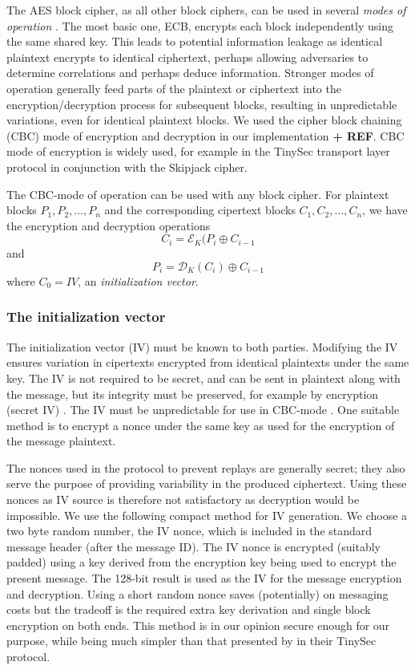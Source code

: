 The AES block cipher, as all other block ciphers, can be used in several \textit{modes of operation} . The most basic one, ECB, encrypts each block independently using the same shared key.  This leads to potential information leakage as identical plaintext encrypts to identical ciphertext, perhaps allowing adversaries to determine correlations and perhaps deduce information. Stronger modes of operation generally feed parts of the plaintext or ciphertext into the encryption/decryption process for subsequent blocks, resulting in unpredictable variations, even for identical plaintext blocks. We used the cipher block chaining (CBC) mode of encryption and decryption in our implementation \textbf{ + REF}. CBC mode of encryption is widely used, for example in the TinySec transport layer protocol  in conjunction with the Skipjack \cite{} cipher.

The CBC-mode of operation can be used with any block cipher. For plaintext blocks $P_1, P_2, \dots, P_n$ and the corresponding cipertext blocks $C_1, C_2, \dots, C_n$, we have the encryption and decryption operations
\[
C_i = \mathcal{E}_K(P_i \oplus C_{i-1}
\]
and 
\[
P_i = \mathcal{D}_K(C_i) \oplus C_{i-1}
\]
where $C_0=IV$, an \textit{initialization vector}. 

\subsubsection{The initialization vector}

The initialization vector (IV) must be known to both parties. Modifying the IV ensures variation in cipertexts encrypted from identical plaintexts under the same key. The IV is not required to be secret, and can be sent in plaintext along with the message, but its integrity must be preserved, for example by encryption (secret IV) . The IV must be unpredictable for use in CBC-mode . One suitable method is to encrypt a nonce under the same key as used for the encryption of the message plaintext. 

The nonces used in the protocol to prevent replays are generally secret; they also serve the purpose of providing variability in the produced ciphertext. Using these nonces as IV source is therefore not satisfactory as decryption would be impossible. We use the following compact method for IV generation. We choose a two byte random number, the IV nonce, which is included in the standard message header (after the message ID). The IV nonce is encrypted (suitably padded) using a key derived from the encryption key being used to encrypt the present message. The 128-bit result is used as the IV for the message encryption and decryption. Using a short random nonce saves (potentially) on messaging costs but the tradeoff is the required extra key derivation and single block encryption on both ends.
%
This method is in our opinion secure enough for our purpose, while being much simpler than that presented by  in their TinySec protocol.

